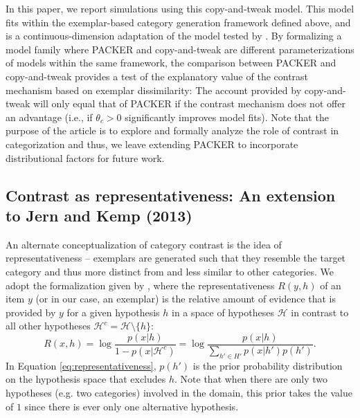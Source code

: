 \documentclass[12pt]{article}
\begin{document}
\begin{flushleft}
In this paper, we report simulations using this copy-and-tweak model. This model
fits within the exemplar-based category generation framework defined above, and
is a continuous-dimension adaptation of the model tested by
\cite{jern2013probabilistic}. By formalizing a model family where PACKER and
copy-and-tweak are different parameterizations of models within the same
framework, the comparison between PACKER and copy-and-tweak provides a test of
the explanatory value of the contrast mechanism based on exemplar dissimilarity:
The account provided by copy-and-tweak will only equal that of PACKER if the
contrast mechanism does not offer an advantage (i.e., if $\theta_c > 0$
significantly improves model fits). Note that the purpose of the article is to
explore and formally analyze the role of contrast in categorization and thus, we
leave extending PACKER to incorporate distributional factors for future work.

\subsection{Contrast as representativeness: An extension to Jern and Kemp
(2013)}
\label{section:representativeness-definition}

An alternate conceptualization of category contrast is the idea of
representativeness -- exemplars are generated such that they resemble the target
category and thus more distinct from and less similar to other categories. We
adopt the formalization given by \cite{tenenbaum01}, where the
representativeness $R(y,h)$ of an item $y$ (or in our case, an exemplar) is the
relative amount of evidence that is provided by $y$ for a given hypothesis $h$
in a space of hypotheses $\mathcal{H}$ in contrast to all other hypotheses
$\mathcal{H}^c=\mathcal{H} \setminus \{h\}$:
\begin{equation}
  R(x,h) = \log \dfrac{p(x|h)}{1-p(x|\mathcal{H}^c)} = \log \dfrac{p(x|h)}{\sum_{h'\in H'}{p(x|h')p(h')}} . 
\label{eq:representativeness}
\end{equation}
In Equation \ref{eq:representativeness}, $p(h')$ is the prior probability
distribution on the hypothesis space that excludes $h$. Note that when there are
only two hypotheses (e.g. two categories) involved in the domain, this prior
takes the value of $1$ since there is ever only one alternative hypothesis. 


\end{flushleft}
\end{document}
